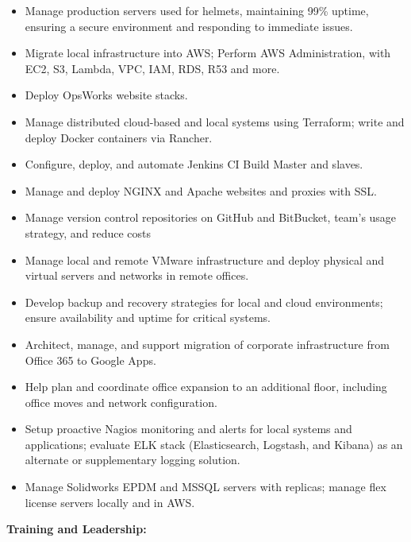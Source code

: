 \documentclass[]{article}
\providecommand{\tightlist}{%
  \setlength{\itemsep}{0pt}\setlength{\parskip}{0pt}}
\begin{document}
\begin{itemize}
\tightlist
\item
  Manage production servers used for helmets, maintaining 99\% uptime,
  ensuring a secure environment and responding to immediate issues.
\item
  Migrate local infrastructure into AWS; Perform AWS Administration,
  with EC2, S3, Lambda, VPC, IAM, RDS, R53 and more.
\item
  Deploy OpsWorks website stacks.
\item
  Manage distributed cloud-based and local systems using Terraform;
  write and deploy Docker containers via Rancher.
\item
  Configure, deploy, and automate Jenkins CI Build Master and slaves.
\item
  Manage and deploy NGINX and Apache websites and proxies with SSL.
\item
  Manage version control repositories on GitHub and BitBucket, team's
  usage strategy, and reduce costs
\item
  Manage local and remote VMware infrastructure and deploy physical and
  virtual servers and networks in remote offices.
\item
  Develop backup and recovery strategies for local and cloud
  environments; ensure availability and uptime for critical systems.
\item
  Architect, manage, and support migration of corporate infrastructure
  from Office 365 to Google Apps.
\item
  Help plan and coordinate office expansion to an additional floor,
  including office moves and network configuration.
\item
  Setup proactive Nagios monitoring and alerts for local systems and
  applications; evaluate ELK stack (Elasticsearch, Logstash, and Kibana)
  as an alternate or supplementary logging solution.
\item
  Manage Solidworks EPDM and MSSQL servers with replicas; manage flex
  license servers locally and in AWS.
\end{itemize}

\textbf{Training and Leadership:}
\end{document}
